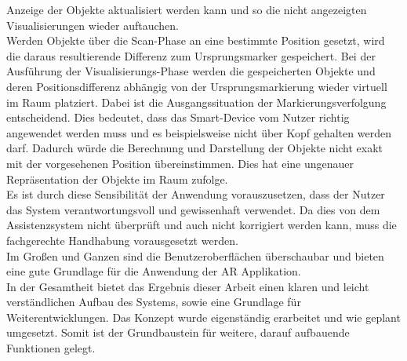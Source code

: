 Anzeige der Objekte aktualisiert werden kann und so die nicht angezeigten Visualisierungen wieder auftauchen.
\\ 
\linebreak
Werden Objekte über die Scan-Phase an eine bestimmte Position gesetzt, wird die daraus resultierende Differenz zum Ursprungsmarker gespeichert. Bei der 
Ausführung der Visualisierungs-Phase werden die gespeicherten Objekte und deren Positionsdifferenz abhängig von der Ursprungsmarkierung wieder virtuell im Raum platziert. 
Dabei ist die Ausgangssituation der Markierungsverfolgung entscheidend. Dies bedeutet, dass das Smart-Device vom Nutzer richtig angewendet werden muss und es beispielsweise 
nicht über Kopf gehalten werden darf. Dadurch würde die Berechnung und Darstellung der Objekte nicht exakt mit der vorgesehenen Position übereinstimmen. Dies hat eine 
ungenauer Repräsentation der Objekte im Raum zufolge. 
\\ 
Es ist durch diese Sensibilität der Anwendung vorauszusetzen, dass der Nutzer das System verantwortungsvoll und gewissenhaft verwendet. Da dies von dem Assistenzsystem nicht überprüft 
und auch nicht korrigiert werden kann, muss die fachgerechte Handhabung vorausgesetzt werden. 
\\ 
\linebreak
Im Großen und Ganzen sind die Benutzeroberflächen überschaubar und bieten eine gute Grundlage für die Anwendung der \acl{AR} Applikation. 
\\ 
\linebreak
In der Gesamtheit bietet das Ergebnis dieser Arbeit einen klaren und leicht verständlichen Aufbau des Systems, sowie eine Grundlage für Weiterentwicklungen. 
Das Konzept wurde eigenständig erarbeitet und wie geplant umgesetzt. Somit ist der Grundbaustein für weitere, darauf aufbauende Funktionen gelegt.

